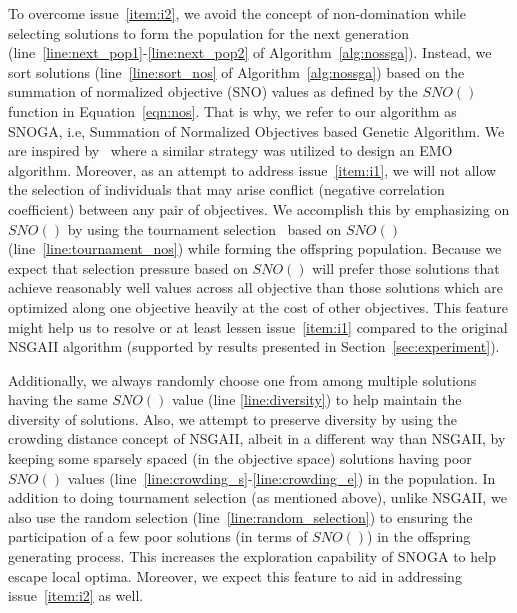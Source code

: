 To overcome issue~\ref{item:i2}, we avoid the concept of non-domination while selecting solutions to form the population for the next generation (line~\ref{line:next_pop1}-\ref{line:next_pop2} of Algorithm~\ref{alg:nossga}). Instead, we sort solutions (line~\ref{line:sort_nos} of Algorithm~\ref{alg:nossga}) based on the summation of normalized objective (SNO) values as defined by the $SNO()$ function in Equation~\ref{eqn:nos}. That is why, we refer to our algorithm as SNOGA, i.e, Summation of Normalized Objectives based Genetic Algorithm. We are inspired by~\cite{qu2010multi} where a similar strategy was utilized to design an EMO algorithm. Moreover, as an attempt to address issue~\ref{item:i1}, we will not allow the selection of individuals that may arise conflict (negative correlation coefficient) between any pair of objectives. We accomplish this by emphasizing on $SNO()$ by using the tournament selection~\cite{goldberg1991comparative} based on $SNO()$ (line~\ref{line:tournament_nos}) while forming the offspring population.
Because we expect that selection pressure based on $SNO()$ will prefer those solutions that achieve reasonably well values across all objective than those solutions which are optimized along one objective heavily at the cost of other objectives. This feature might help us to resolve or at least lessen issue~\ref{item:i1} compared to the original NSGAII algorithm (supported by results presented in Section~\ref{sec:experiment}). %

Additionally, we always randomly choose one from among multiple solutions having the same $SNO()$ value (line \ref{line:diversity}) to help maintain the diversity of solutions. Also, we attempt to preserve diversity by using the crowding distance concept of NSGAII, albeit in a different way than NSGAII, by keeping some sparsely spaced (in the objective space) solutions having poor $SNO()$ values (line~\ref{line:crowding_s}-\ref{line:crowding_e}) in the population. In addition to doing tournament selection (as mentioned above), unlike NSGAII, we also use the random selection (line~\ref{line:random_selection}) to ensuring the participation of a few poor solutions (in terms of $SNO()$) in the offspring generating process. This increases the exploration capability of SNOGA to help escape local optima. Moreover, we expect this feature to aid in addressing issue~\ref{item:i2} as well.



